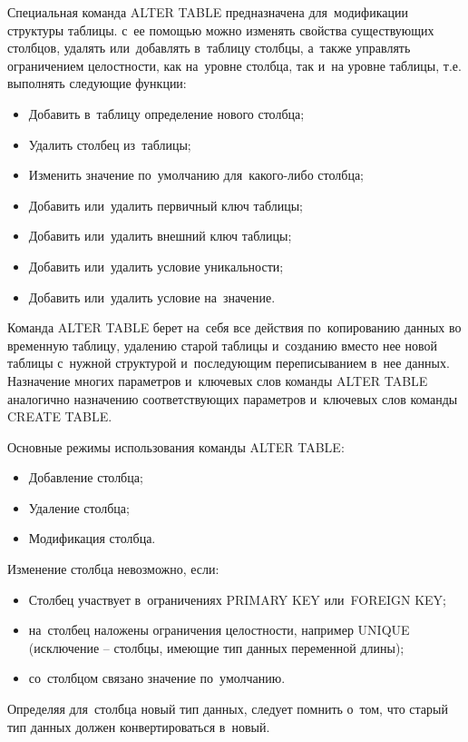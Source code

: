 \documentclass{ou}
\begin{document}
Специальная команда ALTER TABLE предназначена для~модификации структуры таблицы. с~ее помощью можно изменять свойства существующих столбцов, удалять или~добавлять в~таблицу столбцы, а~также управлять ограничением целостности, как на~уровне столбца, так и~на уровне таблицы, т.е. выполнять следующие функции: 
\begin{itemize}[label=-, itemindent=4em, nosep]
\item Добавить в~таблицу определение нового столбца;
\item Удалить столбец из~таблицы;
\item Изменить значение по~умолчанию для~какого-либо столбца;
\item Добавить или~удалить первичный ключ таблицы;
\item Добавить или~удалить внешний ключ таблицы;
\item Добавить или~удалить условие уникальности;
\item Добавить или~удалить условие на~значение.
\end{itemize}
 
Команда ALTER TABLE берет на~себя все действия по~копированию данных во временную таблицу, удалению старой таблицы и~созданию вместо нее новой таблицы с~нужной структурой и~последующим переписыванием в~нее данных. Назначение многих параметров и~ключевых слов команды ALTER TABLE аналогично назначению соответствующих параметров и~ключевых слов команды CREATE TABLE. 

Основные режимы использования команды ALTER TABLE: 
\begin{itemize}[label=-, itemindent=4em, nosep]
\item Добавление столбца;
\item Удаление столбца;
\item Модификация столбца.
\end{itemize}

Изменение столбца невозможно, если: 

\begin{itemize}[label=-, itemindent=4em, nosep]
\item Столбец участвует в~ограничениях PRIMARY KEY или~FOREIGN KEY;
\item на~столбец наложены ограничения целостности, например UNIQUE (исключение -- столбцы, имеющие тип данных переменной длины);
\item со~столбцом связано значение по~умолчанию.
\end{itemize}

Определяя для~столбца новый тип данных, следует помнить о~том, что старый тип данных должен конвертироваться в~новый. 
\end{document}
